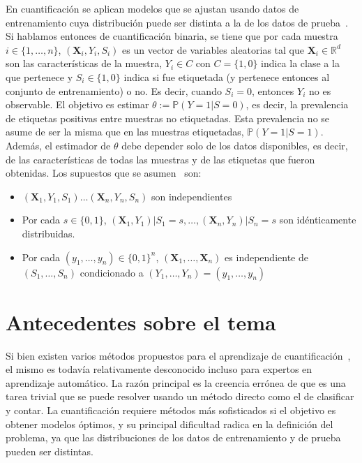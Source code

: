 \documentclass[a4paper, twoside, 11pt, spanish]{article}
\begin{document}
En cuantificación se aplican modelos que se ajustan usando datos de
entrenamiento cuya distribución puede ser distinta a la de los datos de
prueba~\cite{forman2005counting}. Si hablamos entonces de cuantificación
binaria, se tiene que por cada muestra $i \in \{1,\dots,n\}$,
$(\boldsymbol{X}_i,Y_i,S_i)$ es un vector de variables aleatorias tal que
$\boldsymbol{X}_i \in \mathbb{R}^d$ son las características de la muestra, $Y_i
\in C$ con $C=\{1,0\}$ indica la clase a la que pertenece y $S_i \in \{1,0\}$
indica si fue etiquetada (y pertenece entonces al conjunto de entrenamiento) o
no. Es decir, cuando $S_i=0$, entonces $Y_i$ no es observable. El objetivo es
estimar $\theta:= \mathbb{P}(Y=1|S=0)$, es decir, la prevalencia de etiquetas
positivas entre muestras no etiquetadas. Esta prevalencia no se asume de ser la
misma que en las muestras etiquetadas, $\mathbb{P}(Y=1|S=1)$. Además, el
estimador de $\theta$ debe depender solo de los datos disponibles, es decir, de
las características de todas las muestras y de las etiquetas que fueron
obtenidas. Los supuestos que se asumen~\cite{vaz2019quantification} son:

\begin{itemize}
  \item $(\boldsymbol{X}_1,Y_1,S_1) \dots (\boldsymbol{X}_n,Y_n,S_n)$ son
  independientes
  \item Por cada $s \in \{0,1\}$,
  $(\boldsymbol{X}_1,Y_1)|S_1=s,\dots,(\boldsymbol{X}_n,Y_n)|S_n=s$ son
  idénticamente distribuidas.
  \item Por cada $(y_1,\dots,y_n)\in{\{0,1\}}^n$,
  $(\boldsymbol{X}_1,\dots,\boldsymbol{X}_n)$ es independiente de
  $(S_1,\dots,S_n)$ condicionado a $(Y_1,\dots,Y_n)=(y_1,\dots,y_n)$
\end{itemize}

\section*{Antecedentes sobre el tema}

Si bien existen varios métodos propuestos para el aprendizaje de
cuantificación~\cite{esuli2023learning, gonzalez2017review}, el mismo es todavía
relativamente desconocido incluso para expertos en aprendizaje automático. La
razón principal es la creencia errónea de que es una tarea trivial que se puede
resolver usando un método directo como el de clasificar y contar. La
cuantificación requiere métodos más sofisticados si el objetivo es obtener
modelos óptimos, y su principal dificultad radica en la definición del problema,
ya que las distribuciones de los datos de entrenamiento y de prueba pueden ser
distintas.
\end{document}
